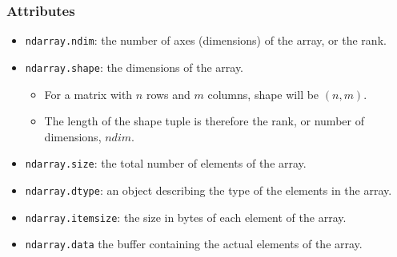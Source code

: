 \documentclass{beamer}
\begin{document}
\begin{frame}[fragile]
\frametitle{Attributes}
\begin{itemize}
\item {\tt ndarray.ndim}: the number of axes (dimensions) of the array, or the rank. 
\item {\tt ndarray.shape}: the dimensions of the array.  
\begin{itemize}
\item For a matrix with $n$ rows and $m$ columns, shape will be $(n,m)$. 
\item The length of the shape tuple is therefore the rank, or number of dimensions, $ndim$.
\end{itemize}
\item {\tt ndarray.size}: the total number of elements of the array.
\item {\tt ndarray.dtype}: an object describing the type of the elements in the array. 
\item {\tt ndarray.itemsize}: the size in bytes of each element of the array. 
\item {\tt ndarray.data} the buffer containing the actual elements of the array. 
\end{itemize}
\end{frame}
\end{document}
